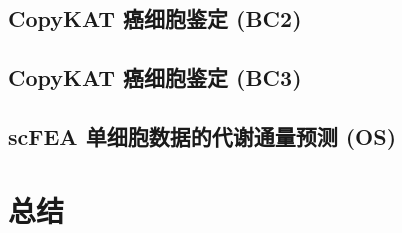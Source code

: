 \documentclass[
]{article}
\begin{document}
\hypertarget{copykat-ux764cux7ec6ux80deux9274ux5b9a-bc2}{%
\subsection{CopyKAT 癌细胞鉴定 (BC2)}\label{copykat-ux764cux7ec6ux80deux9274ux5b9a-bc2}}

\hypertarget{copykat-ux764cux7ec6ux80deux9274ux5b9a-bc3}{%
\subsection{CopyKAT 癌细胞鉴定 (BC3)}\label{copykat-ux764cux7ec6ux80deux9274ux5b9a-bc3}}

\hypertarget{scfea-ux5355ux7ec6ux80deux6570ux636eux7684ux4ee3ux8c22ux901aux91cfux9884ux6d4b-os}{%
\subsection{scFEA 单细胞数据的代谢通量预测 (OS)}\label{scfea-ux5355ux7ec6ux80deux6570ux636eux7684ux4ee3ux8c22ux901aux91cfux9884ux6d4b-os}}

\hypertarget{conclusion}{%
\section{总结}\label{conclusion}}
\end{document}
